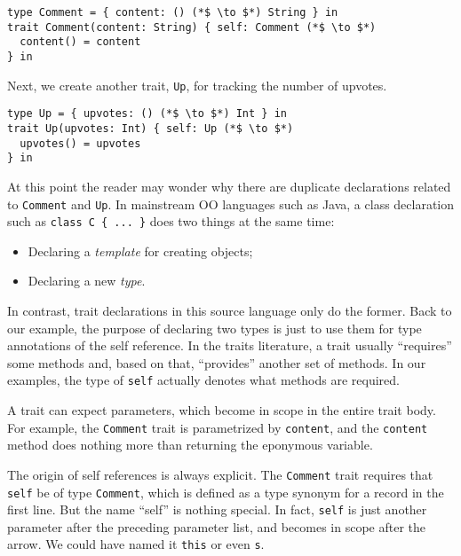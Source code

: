 \begin{lstlisting}
type Comment = { content: () (*$ \to $*) String } in
trait Comment(content: String) { self: Comment (*$ \to $*)
  content() = content
} in
\end{lstlisting}

\noindent Next, we create another trait, \lstinline$Up$, for tracking the number
of upvotes.

\begin{lstlisting}
type Up = { upvotes: () (*$ \to $*) Int } in
trait Up(upvotes: Int) { self: Up (*$ \to $*)
  upvotes() = upvotes
} in
\end{lstlisting}

At this point the reader may wonder why there are duplicate declarations related
to \lstinline$Comment$ and \lstinline$Up$. In mainstream OO languages such as
Java, a class declaration such as \lstinline$class C { ... }$ does two things at
the same time:

\begin{itemize}
\item Declaring a \emph{template} for creating objects;
\item Declaring a new \emph{type}.
\end{itemize}

\noindent In contrast, trait declarations in this source language only do the
former. Back to our example, the purpose of declaring two types is just to use
them for type annotations of the self reference.  In the traits literature, a trait
usually ``requires'' some methods and, based on that,  ``provides'' another set
of methods. In our examples, the type of \lstinline$self$ actually denotes what
methods are required.

A trait can expect parameters, which become in scope in the entire trait body.
For example, the \lstinline$Comment$ trait is parametrized by
\lstinline$content$, and the \lstinline$content$ method does nothing more than
returning the eponymous variable.

The origin of self references is always explicit. The \lstinline$Comment$ trait
requires that \lstinline$self$ be of type \lstinline$Comment$, which is defined
as a type synonym for a record in the first line. But the name ``self'' is
nothing special. In fact, \lstinline$self$ is just another parameter after the
preceding parameter list, and becomes in scope after the arrow. We could have
named it \lstinline$this$ or even \lstinline$s$.


